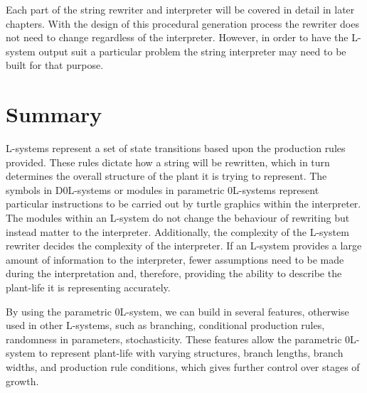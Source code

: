 \noindent
Each part of the string rewriter and interpreter will be covered in detail in later chapters. With the design of this procedural generation process the rewriter does not need to change regardless of the interpreter. However, in order to have the L-system output suit a particular problem the string interpreter may need to be built for that purpose.


\section{Summary}

L-systems represent a set of state transitions based upon the production rules provided. These rules dictate how a string will be rewritten, which in turn determines the overall structure of the plant it is trying to represent. The symbols in D0L-systems or modules in parametric 0L-systems represent particular instructions to be carried out by turtle graphics within the interpreter. The modules within an L-system do not change the behaviour of rewriting but instead matter to the interpreter. Additionally, the complexity of the L-system rewriter decides the complexity of the interpreter. If an L-system provides a large amount of information to the interpreter, fewer assumptions need to be made during the interpretation and, therefore, providing the ability to describe the plant-life it is representing accurately.

By using the parametric 0L-system, we can build in several features, otherwise used in other L-systems, such as branching, conditional production rules, randomness in parameters, stochasticity. These features allow the parametric 0L-system to represent plant-life with varying structures, branch lengths, branch widths, and production rule conditions, which gives further control over stages of growth.

